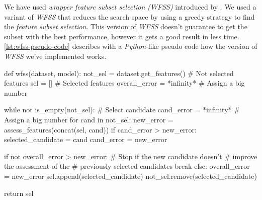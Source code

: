 We have used \textit{wrapper feature subset selection (WFSS)}
introduced by \cite{kohavi1997wrappers}. We used a variant of
\textit{WFSS} that reduces the search space by using a greedy strategy
to find the \textit{feature subset selection}. This version of
\textit{WFSS} doesn't guarantee to get the subset with the best
performance, however it gets a good result in less time.
\autoref{lst:wfss-pseudo-code} describes with a \textit{Python}-like
pseudo code how the version of \textit{WFSS} we've implemented works.

\begin{code}[language = Python, frame = single,
  caption = {\textit{WFSS} pseudo code},
  label = lst:wfss-pseudo-code,
  captionpos = b][bth]
def wfss(dataset, model):
  not_sel = dataset.get_features() # Not selected features
  sel = [] # Selected features
  overall_error = *infinity* # Assign a big number
  
  while not is_empty(not_sel):
    # Select candidate
    cand_error = *infinity* # Assign a big number
    for cand in not_sel:
      new_error = assess_features(concat(sel, cand))
      if cand_error > new_error:
        selected_candidate = cand
        cand_error = new_error

    if not overall_error > new_error:
      # Stop if the new candidate doesn't
      # improve the assessment of the
      # previously selected candidates
      break
    else:
      overall_error = new_error
      sel.append(selected_candidate)
      not_sel.remove(selected_candidate)

  return sel
\end{code}



                
                


                
